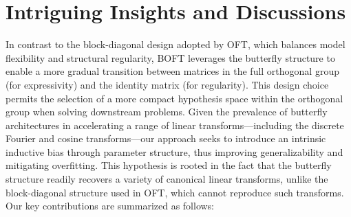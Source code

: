 \section{Intriguing Insights and Discussions}

In contrast to the block-diagonal design adopted by OFT, which balances model flexibility and structural regularity, BOFT leverages the butterfly structure to enable a more gradual transition between matrices in the full orthogonal group (for expressivity) and the identity matrix (for regularity). This design choice permits the selection of a more compact hypothesis space within the orthogonal group when solving downstream problems. Given the prevalence of butterfly architectures in accelerating a range of linear transforms—including the discrete Fourier and cosine transforms—our approach seeks to introduce an intrinsic inductive bias through parameter structure, thus improving generalizability and mitigating overfitting. This hypothesis is rooted in the fact that the butterfly structure readily recovers a variety of canonical linear transforms, unlike the block-diagonal structure used in OFT, which cannot reproduce such transforms. Our key contributions are summarized as follows:

